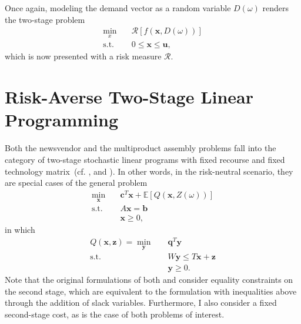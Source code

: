 \documentclass[12pt]{article}
\begin{document}
Once again, modeling the demand vector as a random variable $D(\omega)$ renders the two-stage problem
\begin{align*}
    \min_{x} \quad & \mathcal{R}\left[ f(\bm{x},D(\omega)) \right]  \\
    \textrm{s.t.} \quad & 0\le \bm{x} \le \bm{u}
,\end{align*}
which is now presented with a risk measure $\mathcal{R}$.


\section*{Risk-Averse Two-Stage Linear Programming}

Both the newsvendor and the multiproduct assembly problems fall into the category of two-stage stochastic linear programs with fixed recourse and fixed technology matrix~(cf. \cite[Sec.~3.1]{birgeIntroductionStochasticProgramming2011}, and \cite[Sec.~2.1]{shapiroLecturesStochasticProgramming2009}).
In other words, in the risk-neutral scenario, they are special cases of the general problem
\begin{align*}
    \min_{\bm{x}} \quad & \bm{c}^{T}\bm{x} + \mathbb{E}\left[ Q(\bm{x},Z(\omega)) \right]  \\
    \textrm{s.t.} \quad & A\bm{x} = \bm{b} \\
      & \bm{x} \ge 0
,\end{align*}
in which 
\begin{align*}
    Q(\bm{x},\bm{z}) = \min_{\bm{y}} \quad & \bm{q}^{T}\bm{y} \\
    \textrm{s.t.} \quad & W\bm{y} \le T\bm{x} + \bm{z} \\
      & \bm{y} \ge 0
.\end{align*}
Note that the original formulations of both \citet{birgeIntroductionStochasticProgramming2011} and \citet{shapiroLecturesStochasticProgramming2009} consider equality constraints on the second stage, which are equivalent to the formulation with inequalities above through the addition of slack variables.
Furthermore, I also consider a fixed second-stage cost, as is the case of both problems of interest.
\end{document}
